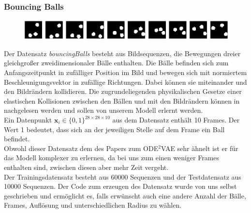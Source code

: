 \documentclass[12pt]{article}
\newcommand{\x}{\mathbf{x}_i}
\begin{document}
	\subsubsection{Bouncing Balls}
	\begin{figure}[!htbp]
		\centering
		\includegraphics[scale=0.4]{bouncingBalls}
	\end{figure}
	Der Datensatz \emph{bouncingBalls} besteht aus Bildsequenzen, die Bewegungen dreier gleichgroßer zweidimensionaler Bälle enthalten. Die Bälle befinden sich zum Anfangszeitpunkt in zufälliger Position im Bild und bewegen sich mit normiertem Beschleunigungsvektor in zufällige Richtungen. Dabei können sie miteinander und den Bildrändern kollidieren.
	Die zugrundeliegenden physikalischen Gesetze einer elastischen Kollisionen zwischen den Bällen und mit den Bildrändern können in \cite{ElastKol} nachgelesen werden und sollen von unserem Modell erlernt werden. \\
	Ein Datenpunkt $\x\in \{0,1\}^{28\times 28\times 10}$ aus dem Datensatz enthält 10 Frames. Der Wert 1 bedeutet, dass sich an der jeweiligen
	Stelle auf dem Frame ein Ball befindet.\\
	Obwohl dieser Datensatz dem des Papers zum ODE$^2$VAE sehr ähnelt ist er für das Modell komplexer zu erlernen, da bei uns zum einen weniger Frames enthalten sind, zwischen diesen aber mehr Zeit vergeht.\\
	Der Trainingsdatensatz besteht aus 60000 Sequenzen und der Testdatensatz aus 10000 Sequenzen.
	Der Code zum erzeugen des Datensatz wurde von uns selbst geschrieben und ermöglicht es, falls erwünscht auch eine andere Anzahl der Bälle, Frames, Auflösung und unterschiedlichen Radius zu wählen.
\end{document}

